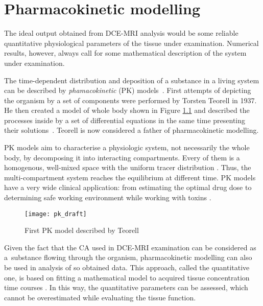 \chapter{Pharmacokinetic modelling}
\label{chapter:pk}

The ideal output obtained from DCE-MRI analysis would be some reliable quantitative physiological parameters of the tissue under examination. Numerical results, however, always call for some mathematical description of the system under examination. 

The time-dependent distribution and deposition of a substance in a living system can be described by \textit{phamacokinetic} (PK) models~\cite{gerlowski1983physiologically}. First attempts of depicting the organism by a set of components were performed by Torsten Teorell in 1937. He then created a model of whole body shown in Figure \ref{fig:pk_draft} and described the processes inside by a set of differential equations in the same time presenting  their solutions~\cite{pkfather}. Teorell is now considered  a father of pharmacokinetic modelling. 


PK models aim to characterise a physiologic system, not necessarily the whole body, by decomposing it into interacting compartments. Every of them is a homogenous, well-mixed space with the uniform tracer distribution \cite{PMID:20540902}.
Thus, the multi-compartment system reaches the equilibrium at different time.  PK models have a very wide clinical application: from estimating the optimal drug dose to determining safe working environment while working with toxins  \cite{gerlowski1983physiologically}.


\begin{figure}[H]
		\centering
		\texttt{[image: pk\_draft]}
		\caption [Teorell's first PK model]{First PK model described by Teorell \cite{pkfather}}
		\label{fig:pk_draft}
	\end{figure}

\vspace{1cm}
Given the fact that the CA used in DCE-MRI examination can be considered as a~substance flowing through the organism, pharmacokinetic modelling can also be used in analysis of so obtained data.   
This approach, called the quantitative one, is based on fitting a mathematical model to acquired tissue concentration time courses \cite{khalifa2014models, jackson2005dynamic, barnes2012practical}. In this way, the quantitative parameters can be assessed, which cannot be overestimated while evaluating the tissue function. 


